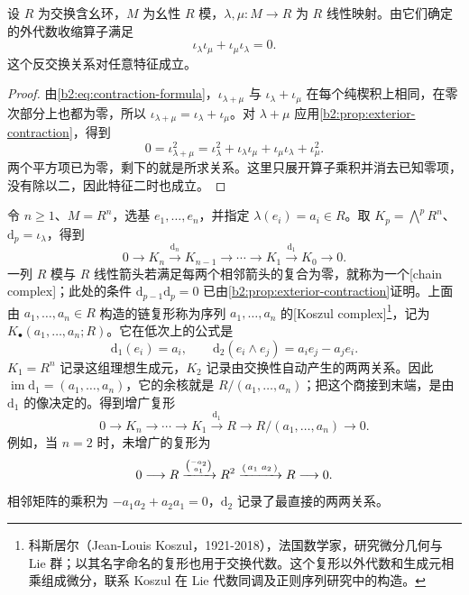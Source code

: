\begin{corollary}\label{b2:cor:contractions-anticommute}
	设 \(R\) 为交换含幺环，\(M\) 为幺性 \(R\) 模，\(\lambda,\mu:M\rightarrow R\) 为 \(R\) 线性映射。由它们确定的外代数收缩算子满足
	\[
		\iota_\lambda\iota_\mu+\iota_\mu\iota_\lambda=0.
	\]
	这个反交换关系对任意特征成立。
\end{corollary}
\begin{proof}
	由\eqref{b2:eq:contraction-formula}，\(\iota_{\lambda+\mu}\) 与 \(\iota_\lambda+\iota_\mu\) 在每个纯楔积上相同，在零次部分上也都为零，所以 \(\iota_{\lambda+\mu}=\iota_\lambda+\iota_\mu\)。对 \(\lambda+\mu\) 应用\cref{b2:prop:exterior-contraction}，得到
	\[
		0=\iota_{\lambda+\mu}^2 =\iota_\lambda^2+\iota_\lambda\iota_\mu +\iota_\mu\iota_\lambda+\iota_\mu^2.
	\]
	两个平方项已为零，剩下的就是所求关系。这里只展开算子乘积并消去已知零项，没有除以二，因此特征二时也成立。
\end{proof}

令 \(n\ge1\)、\(M=R^n\)，选基 \(e_1,\ldots,e_n\)，并指定 \(\lambda(e_i)=a_i\in R\)。取 \(K_p=\bigwedge^pR^n\)、\(\mathrm{d}_p=\iota_\lambda\)，得到
\[
	0\longrightarrow K_n\xrightarrow{\mathrm{d}_n}K_{n-1}\longrightarrow\cdots \longrightarrow K_1\xrightarrow{\mathrm{d}_1}K_0\longrightarrow0.
\]
一列 \(R\) 模与 \(R\) 线性箭头若满足每两个相邻箭头的复合为零，就称为一个[chain complex]；此处的条件 \(\mathrm{d}_{p-1}\mathrm{d}_p=0\) 已由\cref{b2:prop:exterior-contraction}证明。上面由 \(a_1,\ldots,a_n\in R\) 构造的链复形称为序列 \(a_1,\ldots,a_n\) 的[Koszul complex]\footnote{科斯居尔（Jean-Louis Koszul，1921-2018），法国数学家，研究微分几何与 Lie 群；以其名字命名的复形也用于交换代数。这个复形以外代数和生成元相乘组成微分，联系 Koszul 在 Lie 代数同调及正则序列研究中的构造。}，记为 \(K_\bullet(a_1,\ldots,a_n;R)\)。它在低次上的公式是
\[
	\mathrm{d}_1(e_i)=a_i,\qquad \mathrm{d}_2(e_i\wedge e_j)=a_ie_j-a_je_i.
\]
\(K_1=R^n\) 记录这组理想生成元，\(K_2\) 记录由交换性自动产生的两两关系。因此 \(\operatorname{im}\mathrm{d}_1=(a_1,\ldots,a_n)\)，它的余核就是 \(R/(a_1,\ldots,a_n)\)；把这个商接到末端，是由 \(\mathrm{d}_1\) 的像决定的。得到增广复形
\[
	0\longrightarrow K_n\longrightarrow\cdots\longrightarrow K_1 \xrightarrow{\mathrm{d}_1}R\longrightarrow R/(a_1,\ldots,a_n)\longrightarrow0.
\]
例如，当 \(n=2\) 时，未增广的复形为
\[
	0\longrightarrow R\xrightarrow{\binom{-a_2}{a_1}}R^2
	\xrightarrow{\begin{psmallmatrix}a_1&a_2\end{psmallmatrix}}R\longrightarrow0.
\]
相邻矩阵的乘积为 \(-a_1a_2+a_2a_1=0\)，\(\mathrm{d}_2\) 记录了最直接的两两关系。

